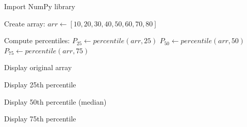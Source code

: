 \begin{algorithm}
\caption{Calculate Percentile Values of a NumPy Array}
\begin{algorithmic}[1]

\STATE Import NumPy library

\STATE Create array:
\STATE $arr \gets [10, 20, 30, 40, 50, 60, 70, 80]$

\STATE Compute percentiles:
\STATE $P_{25} \gets percentile(arr, 25)$
\STATE $P_{50} \gets percentile(arr, 50)$
\STATE $P_{75} \gets percentile(arr, 75)$

\STATE Display original array

\STATE Display 25th percentile

\STATE Display 50th percentile (median)

\STATE Display 75th percentile

\end{algorithmic}
\end{algorithm}